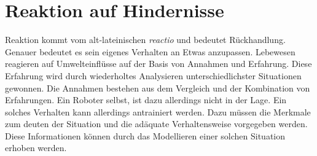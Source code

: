 \chapter{Reaktion auf Hindernisse}
Reaktion kommt vom alt-lateinischen \textit{reactio} und bedeutet Rückhandlung. Genauer bedeutet es sein eigenes Verhalten an Etwas anzupassen. Lebewesen reagieren auf Umwelteinflüsse auf der Basis von Annahmen und Erfahrung. Diese Erfahrung wird durch wiederholtes Analysieren unterschiedlichster Situationen gewonnen. Die Annahmen bestehen aus dem Vergleich und der Kombination von Erfahrungen. Ein Roboter selbst, ist dazu allerdings nicht in der Lage. Ein solches Verhalten kann allerdings antrainiert werden. Dazu müssen die Merkmale zum deuten der Situation und die adäquate Verhaltensweise vorgegeben werden. Diese Informationen können durch das Modellieren einer solchen Situation erhoben werden.


